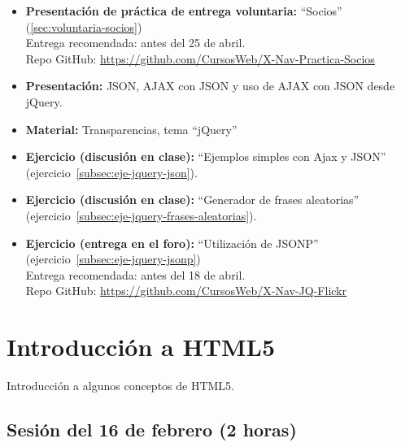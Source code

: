 \documentclass[a4paper,12pt]{report}
\begin{document}
\begin{itemize}
\item \textbf{Presentación de práctica de entrega voluntaria:} ``Socios'' (\ref{sec:voluntaria-socios}) \\
  Entrega recomendada: antes del 25 de abril. \\
  Repo GitHub: \url{https://github.com/CursosWeb/X-Nav-Practica-Socios}
\item \textbf{Presentación:} JSON, AJAX con JSON y uso de AJAX con JSON desde jQuery.
\item \textbf{Material:} Transparencias, tema ``jQuery''
\item \textbf{Ejercicio (discusión en clase):} ``Ejemplos simples con Ajax y JSON'' (ejercicio~\ref{subsec:eje-jquery-json}).
\item \textbf{Ejercicio (discusión en clase):} ``Generador de frases aleatorias'' (ejercicio~\ref{subsec:eje-jquery-frases-aleatorias}).
\item \textbf{Ejercicio (entrega en el foro):} ``Utilización de JSONP'' (ejercicio~\ref{subsec:eje-jquery-jsonp}) \\
  Entrega recomendada: antes del 18 de abril. \\
  Repo GitHub: \url{https://github.com/CursosWeb/X-Nav-JQ-Flickr}
\end{itemize}


\section{Introducción a HTML5}

Introducción a algunos conceptos de HTML5.

\subsection{Sesión del 16 de febrero (2 horas)}
\end{document}
